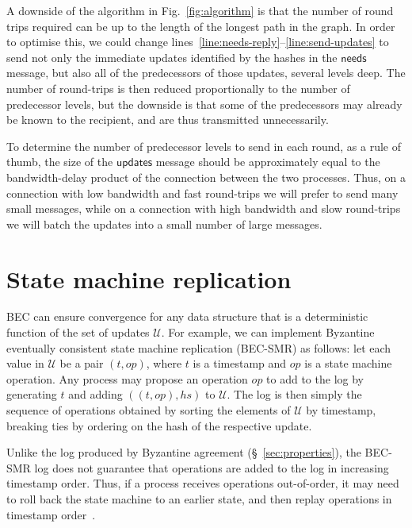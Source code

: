 \documentclass[manuscript,anonymous]{acmart}
\begin{document}
A downside of the algorithm in Fig.~\ref{fig:algorithm} is that the number of round trips required can be up to the length of the longest path in the graph.
In order to optimise this, we could change lines~\ref{line:needs-reply}--\ref{line:send-updates} to send not only the immediate updates identified by the hashes in the $\mathsf{needs}$ message, but also all of the predecessors of those updates, several levels deep.
The number of round-trips is then reduced proportionally to the number of predecessor levels, but the downside is that some of the predecessors may already be known to the recipient, and are thus transmitted unnecessarily.

To determine the number of predecessor levels to send in each round, as a rule of thumb, the size of the $\mathsf{updates}$ message should be approximately equal to the bandwidth-delay product of the connection between the two processes.
Thus, on a connection with low bandwidth and fast round-trips we will prefer to send many small messages, while on a connection with high bandwidth and slow round-trips we will batch the updates into a small number of large messages.


\section{State machine replication}\label{sec:smr}

BEC can ensure convergence for any data structure that is a deterministic function of the set of updates $\mathcal{U}$.
For example, we can implement Byzantine eventually consistent state machine replication (BEC-SMR) as follows: let each value in $\mathcal{U}$ be a pair $(t, \mathit{op})$, where $t$ is a timestamp and $\mathit{op}$ is a state machine operation.
Any process may propose an operation $op$ to add to the log by generating $t$ and adding $((t, \mathit{op}), \mathit{hs})$ to $\mathcal{U}$.
The log is then simply the sequence of operations obtained by sorting the elements of $\mathcal{U}$ by timestamp, breaking ties by ordering on the hash of the respective update.

Unlike the log produced by Byzantine agreement (\S~\ref{sec:properties}), the BEC-SMR log does not guarantee that operations are added to the log in increasing timestamp order.
Thus, if a process receives operations out-of-order, it may need to roll back the state machine to an earlier state, and then replay operations in timestamp order~\cite{Jefferson:1985}.
\end{document}
